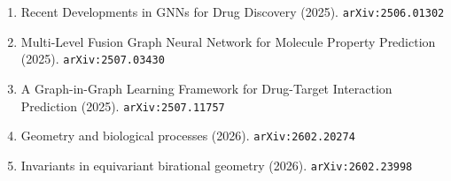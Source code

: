 \documentclass[11pt]{article}
\begin{document}
\begin{enumerate}
  \item Recent Developments in GNNs for Drug Discovery (2025). \texttt{arXiv:2506.01302}
  \item Multi-Level Fusion Graph Neural Network for Molecule Property Prediction (2025). \texttt{arXiv:2507.03430}
  \item A Graph-in-Graph Learning Framework for Drug-Target Interaction Prediction (2025). \texttt{arXiv:2507.11757}
  \item Geometry and biological processes (2026). \texttt{arXiv:2602.20274}
  \item Invariants in equivariant birational geometry (2026). \texttt{arXiv:2602.23998}
\end{enumerate}
\end{document}
